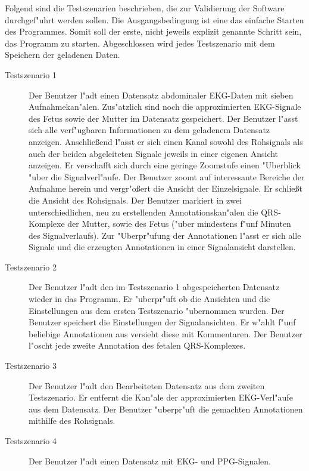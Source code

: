 Folgend sind die Testszenarien beschrieben, die zur Validierung der Software durchgef"uhrt werden sollen.
Die Ausgangsbedingung ist eine das einfache Starten des Programmes.
Somit soll der erste, nicht jeweils explizit genannte Schritt sein, das Programm zu starten.
Abgeschlossen wird jedes Testszenario mit dem Speichern der geladenen Daten.
\begin{description}
\item[Testszenario 1] Der Benutzer l"adt einen Datensatz abdominaler \ac{EKG}-Daten mit sieben Aufnahmekan"alen.
					  Zus"atzlich sind noch die approximierten \ac{EKG}-Signale des Fetus sowie der Mutter im Datensatz gespeichert.
					  Der Benutzer l"asst sich alle verf"ugbaren Informationen zu dem geladenem Datensatz anzeigen.
					  Anschlie\ss end l"asst er sich einen Kanal sowohl des Rohsignals als auch der beiden abgeleiteten Signale jeweils in einer eigenen Ansicht anzeigen.
					  Er verschafft sich durch eine geringe Zoomstufe einen "Uberblick "uber die Signalverl"aufe.
					  Der Benutzer zoomt auf interessante Bereiche der Aufnahme herein und vergr"o\ss ert die Ansicht der Einzelsignale.
					  Er schlie{\ss}t die Ansicht des Rohsignals.
					  Der Benutzer markiert in zwei unterschiedlichen, neu zu erstellenden Annotationskan"alen die QRS-Komplexe der Mutter, sowie des Fetus ("uber mindestens f"unf Minuten des Signalverlaufs).
					  Zur "Uberpr"ufung der Annotationen l"asst er sich alle Signale und die erzeugten Annotationen in einer Signalansicht darstellen.
\item[Testszenario 2] Der Benutzer l"adt den im Testszenario 1 abgespeicherten Datensatz wieder in das Programm.
					  Er "uberpr"uft ob die Ansichten und die Einstellungen aus dem ersten Testszenario "ubernommen wurden.
					  Der Benutzer speichert die Einstellungen der Signalansichten.
					  Er w"ahlt f"unf beliebige Annotationen aus versieht diese mit Kommentaren.
					  Der Benutzer l"oscht jede zweite Annotation des fetalen QRS-Komplexes.
\item[Testszenario 3] Der Benutzer l"adt den Bearbeiteten Datensatz aus dem zweiten Testszenario.
					  Er entfernt die Kan"ale der approximierten \ac{EKG}-Verl"aufe aus dem Datensatz.
					  Der Benutzer "uberpr"uft die gemachten Annotationen mithilfe des Rohsignals.
\item[Testszenario 4] Der Benutzer l"adt einen Datensatz mit \ac{EKG}- und \ac{PPG}-Signalen.

\end{description}
